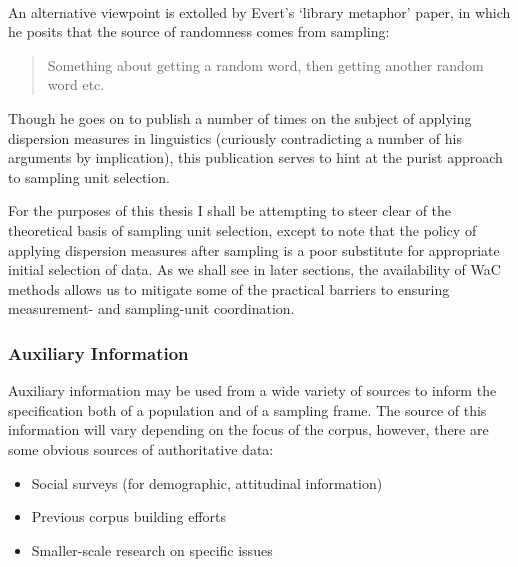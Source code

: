 \paragraph{}
An alternative viewpoint is extolled by Evert's `library metaphor' paper, in which he posits that the source of randomness comes from sampling:

\begin{quote}
Something about getting a random word, then getting another random word etc.
\end{quote}

Though he goes on to publish a number of times on the subject of applying dispersion measures in linguistics (curiously contradicting a number of his arguments by implication), this publication serves to hint at the purist approach to sampling unit selection.

For the purposes of this thesis I shall be attempting to steer clear of the theoretical basis of sampling unit selection, except to note that the policy of applying dispersion measures after sampling is a poor substitute for appropriate initial selection of data.  As we shall see in later sections, the availability of WaC methods allows us to mitigate some of the practical barriers to ensuring measurement- and sampling-unit coordination.




\subsubsection{Auxiliary Information}
Auxiliary information may be used from a wide variety of sources to inform the specification both of a population and of a sampling frame.  The source of this information will vary depending on the focus of the corpus, however, there are some obvious sources of authoritative data:

\begin{itemize}
    \item Social surveys (for demographic, attitudinal information)
    \item Previous corpus building efforts
    \item Smaller-scale research on specific issues
\end{itemize}












